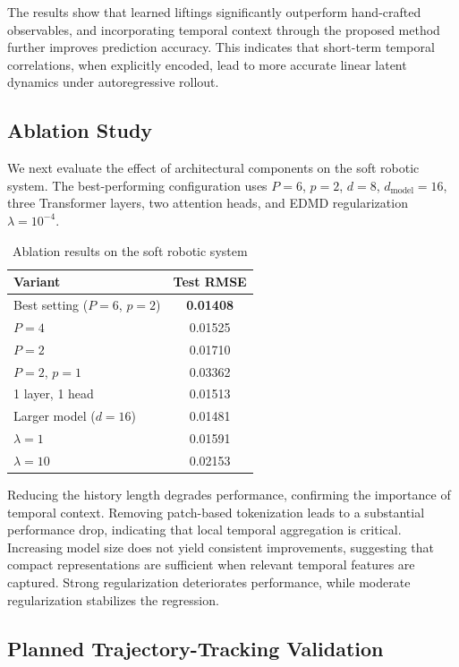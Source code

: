 \documentclass[journal]{IEEEtran}
\begin{document}
The results show that learned liftings significantly outperform hand-crafted observables, and incorporating temporal context through the proposed method further improves prediction accuracy. This indicates that short-term temporal correlations, when explicitly encoded, lead to more accurate linear latent dynamics under autoregressive rollout.

\subsection{Ablation Study}

We next evaluate the effect of architectural components on the soft robotic system. The best-performing configuration uses $P=6$, $p=2$, $d=8$, $d_{\mathrm{model}}=16$, three Transformer layers, two attention heads, and EDMD regularization $\lambda=10^{-4}$.

\begin{table}[!t]
\renewcommand{\arraystretch}{1.2}
\caption{Ablation results on the soft robotic system}
\label{tab:ablation_platform_b}
\centering
\begin{tabular}{p{}c}
\toprule
Variant & Test RMSE \\
\midrule
Best setting ($P=6$, $p=2$) & \textbf{0.01408} \\
$P=4$ & 0.01525 \\
$P=2$ & 0.01710 \\
$P=2$, $p=1$ & 0.03362 \\
1 layer, 1 head & 0.01513 \\
Larger model ($d=16$) & 0.01481 \\
$\lambda=1$ & 0.01591 \\
$\lambda=10$ & 0.02153 \\
\bottomrule
\end{tabular}
\end{table}

Reducing the history length degrades performance, confirming the importance of temporal context. Removing patch-based tokenization leads to a substantial performance drop, indicating that local temporal aggregation is critical. Increasing model size does not yield consistent improvements, suggesting that compact representations are sufficient when relevant temporal features are captured. Strong regularization deteriorates performance, while moderate regularization stabilizes the regression.

\subsection{Planned Trajectory-Tracking Validation}
\end{document}
